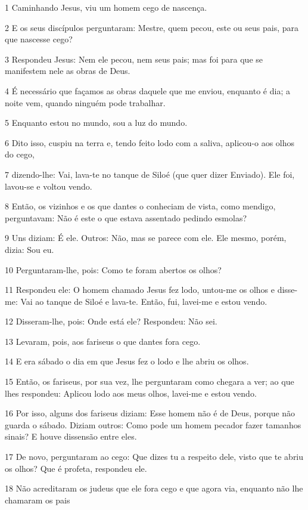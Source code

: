 \par 1 Caminhando Jesus, viu um homem cego de nascença.
\par 2 E os seus discípulos perguntaram: Mestre, quem pecou, este ou seus pais, para que nascesse cego?
\par 3 Respondeu Jesus: Nem ele pecou, nem seus pais; mas foi para que se manifestem nele as obras de Deus.
\par 4 É necessário que façamos as obras daquele que me enviou, enquanto é dia; a noite vem, quando ninguém pode trabalhar.
\par 5 Enquanto estou no mundo, sou a luz do mundo.
\par 6 Dito isso, cuspiu na terra e, tendo feito lodo com a saliva, aplicou-o aos olhos do cego,
\par 7 dizendo-lhe: Vai, lava-te no tanque de Siloé (que quer dizer Enviado). Ele foi, lavou-se e voltou vendo.
\par 8 Então, os vizinhos e os que dantes o conheciam de vista, como mendigo, perguntavam: Não é este o que estava assentado pedindo esmolas?
\par 9 Uns diziam: É ele. Outros: Não, mas se parece com ele. Ele mesmo, porém, dizia: Sou eu.
\par 10 Perguntaram-lhe, pois: Como te foram abertos os olhos?
\par 11 Respondeu ele: O homem chamado Jesus fez lodo, untou-me os olhos e disse-me: Vai ao tanque de Siloé e lava-te. Então, fui, lavei-me e estou vendo.
\par 12 Disseram-lhe, pois: Onde está ele? Respondeu: Não sei.
\par 13 Levaram, pois, aos fariseus o que dantes fora cego.
\par 14 E era sábado o dia em que Jesus fez o lodo e lhe abriu os olhos.
\par 15 Então, os fariseus, por sua vez, lhe perguntaram como chegara a ver; ao que lhes respondeu: Aplicou lodo aos meus olhos, lavei-me e estou vendo.
\par 16 Por isso, alguns dos fariseus diziam: Esse homem não é de Deus, porque não guarda o sábado. Diziam outros: Como pode um homem pecador fazer tamanhos sinais? E houve dissensão entre eles.
\par 17 De novo, perguntaram ao cego: Que dizes tu a respeito dele, visto que te abriu os olhos? Que é profeta, respondeu ele.
\par 18 Não acreditaram os judeus que ele fora cego e que agora via, enquanto não lhe chamaram os pais

